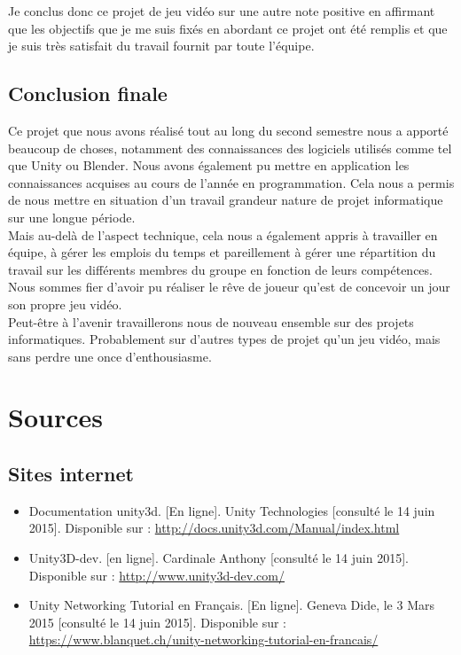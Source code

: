 \documentclass[12pt, titlepage]{article}
\begin{document}
\begin{spacing}{1.5}
Je conclus donc ce projet de jeu vidéo sur une autre note positive en affirmant que les objectifs que je me suis fixés en abordant ce projet ont été remplis et que je suis très satisfait du travail fournit par toute l’équipe.\\

\newpage

\subsection{Conclusion finale}

Ce projet que nous avons réalisé tout au long du second semestre nous a apporté beaucoup de choses, notamment des connaissances des logiciels utilisés comme tel que Unity ou Blender. Nous avons également pu mettre en application les connaissances acquises au cours de l'année en programmation. Cela nous a permis de nous mettre en situation d'un travail grandeur nature de projet informatique sur une longue période.\\

Mais au-delà de l'aspect technique, cela nous a également appris à travailler en équipe, à gérer les emplois du temps et pareillement à gérer une répartition du travail sur les différents membres du groupe en fonction de leurs compétences. Nous sommes fier d'avoir pu réaliser le rêve de joueur qu'est de concevoir un jour son propre jeu vidéo.\\

Peut-être à l'avenir travaillerons nous de nouveau ensemble sur des projets informatiques. Probablement sur d'autres types de projet qu'un jeu vidéo, mais sans perdre une once d'enthousiasme.

\newpage
\section{Sources}
\subsection{Sites internet}

\begin{itemize}
\item Documentation unity3d. [En ligne]. Unity Technologies [consulté le 14 juin 2015]. Disponible sur : \url{http://docs.unity3d.com/Manual/index.html}\\
\item Unity3D-dev. [en ligne]. Cardinale Anthony [consulté le 14 juin 2015]. Disponible sur : \url{http://www.unity3d-dev.com/}\\
\item Unity Networking Tutorial en Français. [En ligne]. Geneva Dide, le 3 Mars 2015 [consulté le 14 juin 2015]. Disponible sur : \url{https://www.blanquet.ch/unity-networking-tutorial-en-francais/}\\
\end{itemize}


\end{spacing}
\end{document}
